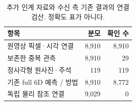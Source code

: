 \begin{table}[t]\centering\footnotesize
\caption{추가 인계 자료와 수신 측 기존 결과의 연결 검산. 정확도 표가 아니다.}\label{sup:remaining_connection}
\begin{tabularx}{\columnwidth}{Yrr}\toprule
항목 & 분모 & 확인 수 \\\midrule
원영상 픽셀·시각 연결 & 8,910 & 8,910 \\
보존한 중복 관측 & 8,910 & 29 \\
정사각형 원사진·주석 & 119 & 119 \\
기존 full 6D 예측 / 방법 & 8,910 & 8,772 \\
독립 물리 참조 연결 & 9,029 & 0 \\
\bottomrule\end{tabularx}
\end{table}
